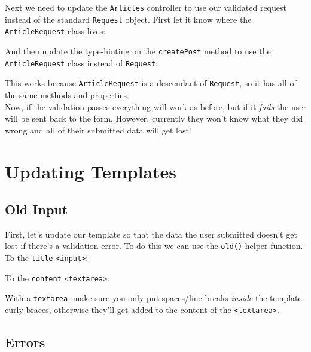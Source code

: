 
Next we need to  update the \texttt{Articles} controller to use our validated request instead of the standard \texttt{Request} object. First let it know where the \texttt{ArticleRequest} class lives:


And then update the type-hinting on the \texttt{createPost} method to use the \texttt{ArticleRequest} class instead of \texttt{Request}:


This works because \texttt{ArticleRequest} is a descendant of \texttt{Request}, so it has all of the same methods and properties.
\\

Now, if the validation passes everything will work as before, but if it \textit{fails} the user will be sent back to the form. However, currently they won't know what they did wrong and all of their submitted data will get lost!


\section{Updating Templates}

\subsection{Old Input}

First, let's update our template so that the data the user submitted doesn't get lost if there's a validation error. To do this we can use the \texttt{old()} helper function.
\\

To the \texttt{title} \texttt{<input>}:


To the \texttt{content} \texttt{<textarea>}:


With a \texttt{textarea}, make sure you only put spaces/line-breaks \textit{inside} the template curly braces, otherwise they'll get added to the content of the \texttt{<textarea>}.


\subsection{Errors}

